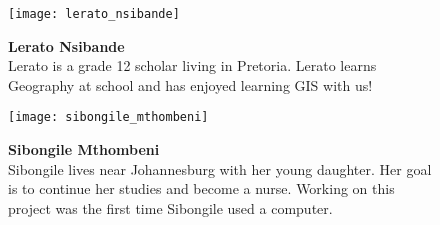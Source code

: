 \begin{figure}[ht]
\centering
\begin{minipage}[h]{5cm}\texttt{[image: lerato\_nsibande]}
\end{minipage}
\begin{minipage}[h]{11cm}
\textbf{Lerato Nsibande} \\
Lerato is a grade 12 scholar living in Pretoria. Lerato learns Geography at
school and has enjoyed learning GIS with us!
\end{minipage}
\end{figure}

\begin{figure}[ht]
\centering
\begin{minipage}[h]{5cm}\texttt{[image: sibongile\_mthombeni]}
\end{minipage}
\begin{minipage}[h]{11cm}
\textbf{Sibongile Mthombeni} \\
Sibongile lives near Johannesburg with her young daughter. Her goal is to
continue her studies and become a nurse. Working on this project was the
first time Sibongile used a computer.
\end{minipage}
\end{figure}


